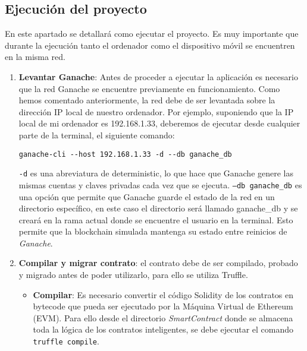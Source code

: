 \subsection{Ejecución del proyecto}

En este apartado se detallará como ejecutar el proyecto. Es muy importante que durante la ejecución tanto el ordenador como el dispositivo móvil se encuentren en la misma red.

\begin{enumerate}

\item \textbf{Levantar Ganache}: Antes de proceder a ejecutar la aplicación es necesario que la red Ganache se encuentre previamente en funcionamiento.
Como hemos comentado anteriormente, la red debe de ser levantada sobre la dirección IP local de nuestro ordenador. Por ejemplo, suponiendo que la IP local de mi ordenador es 192.168.1.33, deberemos de ejecutar desde cualquier parte de la terminal, el siguiente comando: 
\begin{verbatim}
ganache-cli --host 192.168.1.33 -d --db ganache_db
\end{verbatim}

\texttt{-d} es una abreviatura de deterministic, lo que hace que Ganache genere las mismas cuentas y claves privadas cada vez que se ejecuta.
\texttt{--db ganache\_db} es una opción que permite que Ganache guarde el estado de la red en un directorio específico, en este caso el directorio será llamado ganache\_db y se creará en la rama actual donde se encuentre el usuario en la terminal.
Esto permite que la blockchain simulada mantenga su estado entre reinicios de \textit{Ganache}.


\item \textbf{Compilar y migrar contrato}: el contrato debe de ser compilado, probado y migrado antes de poder utilizarlo, para ello se utiliza Truffle.

	\begin{itemize}
	\item \textbf{Compilar}: Es necesario convertir el código
	Solidity de los contratos en bytecode que pueda
	ser ejecutado por la Máquina Virtual de Ethereum (EVM).
	Para ello desde el directorio \textit{SmartContract} donde se
	almacena toda la lógica de los contratos
	inteligentes, se debe ejecutar el comando \texttt{truffle
	compile}.
	
	\end{itemize}
	

\end{enumerate}
